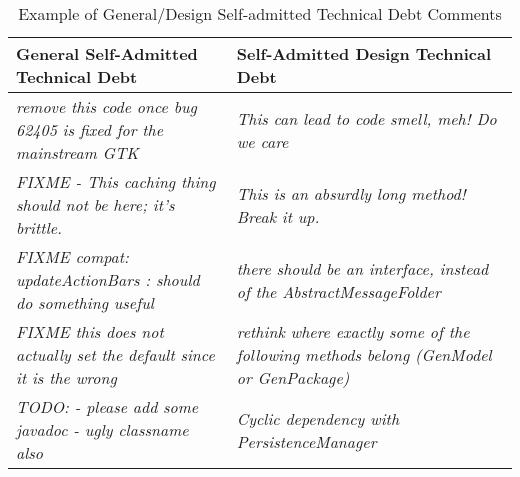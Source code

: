 \begin{table*}[!hbt]
    \begin{center}
        \caption{Example of General/Design Self-admitted Technical Debt Comments}
        \vspace{-2mm}
        \label{tab:satdmotivation}
        \begin{tabular}{ p{3in} | p{3in} } 
            \toprule
            \textbf{General Self-Admitted Technical Debt} &  \textbf{Self-Admitted Design Technical Debt}  \\ 
            \midrule
            \textit{remove this code once bug 62405 is fixed for the mainstream GTK} & \textit{This can lead to code smell, meh! Do we care}\\
            \textit{FIXME - This caching thing should not be here; it's brittle.} & \textit{This is an absurdly long method! Break it up.}\\
            \textit{FIXME compat: updateActionBars : should do something useful} & \textit{there should be an interface, instead of the         AbstractMessageFolder}\\
            \textit{FIXME this does not actually set the default since it is the wrong} & \textit{rethink where exactly some of the following methods belong (GenModel or GenPackage)}\\
            \textit{TODO: - please add some javadoc - ugly classname also} & \textit{Cyclic dependency with PersistenceManager}\\


\end{tabular}
\end{center}
\end{table*}
